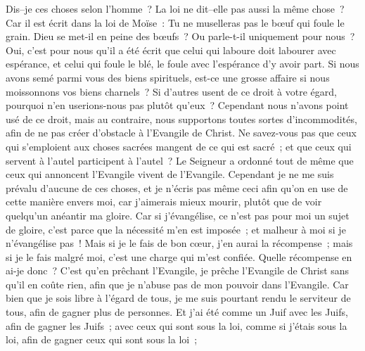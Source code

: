 \begin{multicols}{2}
Dis–je ces choses selon l'homme~? La loi ne dit–elle pas aussi la même chose~?
Car il est écrit dans la loi de Moïse~: Tu ne muselleras pas le bœuf qui foule le grain. Dieu se met-il en peine des bœufs~?
Ou parle-t-il uniquement pour nous~? Oui, c'est pour nous qu'il a été écrit que celui qui laboure doit labourer avec espérance, et celui qui foule le blé, le foule avec l'espérance d'y avoir part.
Si nous avons semé parmi vous des biens spirituels, est-ce une grosse affaire si nous moissonnons vos biens charnels~?
Si d'autres usent de ce droit à votre égard, pourquoi n'en userions-nous pas plutôt qu'eux~? Cependant nous n'avons point usé de ce droit, mais au contraire, nous supportons toutes sortes d'incommodités, afin de ne pas créer d'obstacle à l'Evangile de Christ.
Ne savez-vous pas que ceux qui s'emploient aux choses sacrées mangent de ce qui est sacré~; et que ceux qui servent à l'autel participent à l'autel~?
Le Seigneur a ordonné tout de même que ceux qui annoncent l'Evangile vivent de l'Evangile.
Cependant je ne me suis prévalu d'aucune de ces choses, et je n'écris pas même ceci afin qu'on en use de cette manière envers moi, car j'aimerais mieux mourir, plutôt que de voir quelqu'un anéantir ma gloire.
Car si j'évangélise, ce n'est pas pour moi un sujet de gloire, c'est parce que la nécessité m'en est imposée~; et malheur à moi si je n'évangélise pas~!
Mais si je le fais de bon cœur, j'en aurai la récompense~; mais si je le fais malgré moi, c'est une charge qui m'est confiée.
Quelle récompense en ai-je donc~? C'est qu'en prêchant l'Evangile, je prêche l'Evangile de Christ sans qu'il en coûte rien, afin que je n'abuse pas de mon pouvoir dans l'Evangile.
Car bien que je sois libre à l'égard de tous, je me suis pourtant rendu le serviteur de tous, afin de gagner plus de personnes.
Et j'ai été comme un Juif avec les Juifs, afin de gagner les Juifs~; avec ceux qui sont sous la loi, comme si j'étais sous la loi, afin de gagner ceux qui sont sous la loi~;

\end{multicols}

